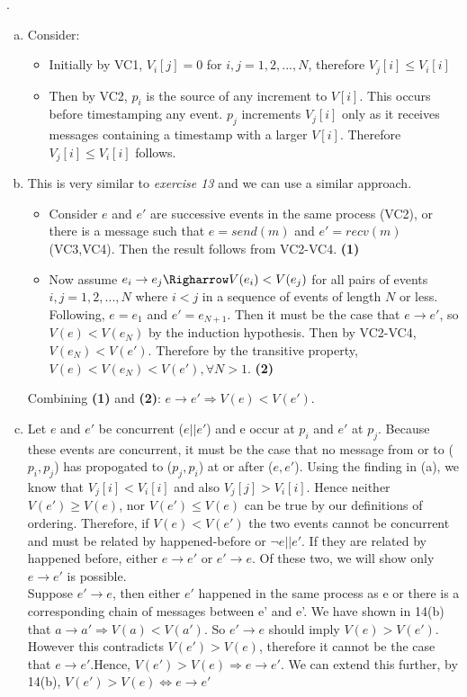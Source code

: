 \documentclass[12pt]{article}
\newcounter{question}
\newcommand{\question}[1]{
    \stepcounter{question}
    \thequestion. #1 \hfill
}
\begin{document}
\question{

    \begin{enumerate}[(a)]
        \item Consider:
            \begin{itemize}
                \item Initially by VC1, $V_i[j]=0$ for $i,j = 1,2,...,N$, therefore $V_j[i] \leq V_i[i]$
                \item Then by VC2, $p_i$ is the source of any increment to $V[i]$. This occurs before timestamping any event. $p_j$ increments $V_j[i]$ only as it receives messages containing a timestamp with a larger $V[i]$. Therefore $V_j[i] \leq V_i[i]$ follows.
            \end{itemize}
        \item This is very similar to \textit{exercise 13} and we can use a similar approach.
            \begin{itemize}
                \item Consider $e$ and $e'$ are successive events in the same process (VC2), or there is a message such that $e = send(m)$ and $e' = recv(m)$ (VC3,VC4). Then the result follows from VC2-VC4. \textbf{(1)}
                \item Now assume $e_i \rightarrow e_j \Righarrow V(e_i) < V(e_j)$ for all pairs of events $i,j =  1,2,...,N$ where $i < j$ in a sequence of events of length $N$ or less. Following, $e = e_1$ and $e' = e_{N+1}$. Then it must be the case that $e \rightarrow e'$, so $V(e) < V(e_N)$ by the induction hypothesis. Then by VC2-VC4, $V(e_N) < V(e')$. Therefore by the transitive property, $V(e) < V(e_N) < V(e'), \forall N > 1$. \textbf{(2)}
            \end{itemize}
            Combining \textbf{(1)} and \textbf{(2)}: $e \rightarrow e' \Rightarrow V(e) < V(e')$.
        \item Let $e$ and $e'$ be concurrent ($e || e'$) and e occur at $p_i$ and $e'$ at $p_j$. Because these events are concurrent, it must be the case that no message from or to ($p_i, p_j$) has propogated to ($p_j, p_i$) at or after ($e, e'$). Using the finding in (a), we know that $V_j[i] < V_i[i]$ and also $V_j[j] > V_i[i]$. Hence neither $V(e') \geq V(e)$, nor $V(e') \leq V(e)$ can be true by our definitions of ordering. Therefore, if $V(e) < V(e')$ the two events cannot be concurrent and must be related by happened-before or $\lnot e || e'$. If they are related by happened before, either $e \rightarrow e'$  or $e' \rightarrow e$. Of these two, we will show only $e \rightarrow e'$ is possible.\\ Suppose $e' \rightarrow e$, then either $e'$ happened in the same process as e or there is a corresponding chain of messages between e' and e'. We have shown in 14(b) that $a \rightarrow a' \Rightarrow V(a) < V(a')$. So $e' \rightarrow e$ should imply $V(e) > V(e')$. However this contradicts $V(e') > V(e)$, therefore it cannot be the case that $e \rightarrow e'$.Hence, $V(e') > V(e) \Rightarrow e \rightarrow e'$. We can extend this further, by 14(b), $V(e') > V(e) \Leftrightarrow e \rightarrow e'$
    \end{enumerate}
}
\end{document}
